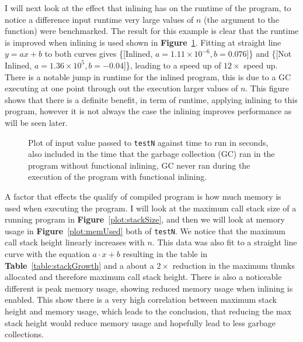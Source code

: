 \documentclass[float=false, crop=false]{standalone}
\newlength\gwidth
\newlength\gheight
\newcommand{\namefig}{\textbf{Figure}~}
\newcommand{\nametable}{\textbf{Table}~}
\newcommand{\importMGraph}[3]{\setlength{\gwidth}{#2}\setlength{\gheight}{#3}{#1}}
\begin{document}
I will next look at the effect that inlining has on the runtime of the 
program, to notice a difference input runtime very large values of $n$ (the 
argument to the function) were benchmarked. The result for this
example is clear that the runtime is improved when inlining is used shown in \namefig\ref{plot:inlinePlot}.
Fitting at straight line $y=ax+b$ to both curves gives 
  \{[Inlined, $a=1.11\times 10^{-6}, b = 0.076$]\} and 
  \{[Not Inlined, $a = 1.36\times 10^{5}, b= -0.04$]\}, leading to a speed up of $12 \times$ speed up.
  There is a notable jump in runtime for the inlined program, this is due to a GC 
  executing at one point through out the execution larger values of $n$. 
  This figure shows that there is a definite benefit, 
  in term of runtime, applying inlining to this program, however
  it is not always the case the inlining improves performance as will 
  be seen later. 

\begin{figure}
\begin{samepage}
  \centering
  \importMGraph{inlinePlot}{0.96\textwidth}{0.4\textwidth}
  \caption[Runtime of \texttt{testN} as a function on input size $n$]
  {Plot of input value passed to \texttt{testN} against time to run in seconds,
    also included in the time that the garbage collection (GC) ran in the program 
    without functional inlining, GC never ran during the execution of the 
    program with functional inlining. }
  \label{plot:inlinePlot}
\end{samepage}
\end{figure}

A factor that effects the qualify of compiled program is how much memory
is used when executing the program. I will look at the maximum call stack size
of a running program in \namefig\ref{plot:stackSize}, and then we will look at memory usage in 
\namefig\ref{plot:memUsed} both of \texttt{testN}. 
We notice that the maximum call stack height linearly increases with $n$. 
This data was also fit to a straight line curve
with the equation $a\cdot x + b$ resulting in the table in \nametable\ref{table:stackGrowth} 
and a about a $2\times$ reduction in the maximum thunks allocated and therefore
maximum call stack height. There is also a noticeable different is peak memory usage, 
showing reduced memory usage when inlining is enabled.
This show there is a very high correlation between maximum
stack height and memory usage, which leads to the conclusion, that reducing the 
max stack height would reduce memory usage and hopefully lead to less garbage collections.
\end{document}
